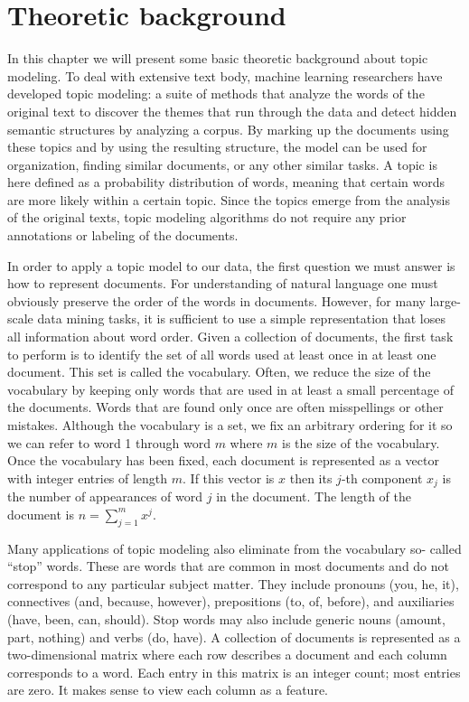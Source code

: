 \documentclass[12pt]{report}
\begin{document}
\section{Theoretic background}

In this chapter we will present some basic theoretic background about topic
modeling. To deal with extensive text body, machine learning researchers have
developed topic modeling: a suite of methods that analyze the words of the
original text to discover the themes that run through the data and detect
hidden semantic structures by analyzing a corpus. By marking up the documents
using these topics and by using the resulting structure, the model can be used
for organization, finding similar documents, or any other similar tasks. A
topic is here defined as a probability distribution of words, meaning that
certain words are more likely within a certain topic. Since the topics emerge
from the analysis of the original texts, topic modeling algorithms do not
require any prior annotations or labeling of the documents.\cite{Blei11introductionto}

In order to apply a topic model to our data, the first question we must answer
is how to represent documents. For understanding of natural language one must
obviously preserve the order of the words in documents. However, for many
large-scale data mining tasks, it is sufficient to use a simple representation
that loses all information about word order. Given a collection of documents,
the first task to perform is to identify the set of all words used at least
once in at least one document. This set is called the vocabulary. Often, we
reduce the size of the vocabulary by keeping only words that are used in at
least a small percentage of the documents. Words that are found only once are
often misspellings or other mistakes. Although the vocabulary is a set, we fix
an arbitrary ordering for it so we can refer to word 1 through word $m$ where
$m$ is the size of the vocabulary. Once the vocabulary has been fixed, each
document is represented as a vector with integer entries of length $m$. If this
vector is $x$ then its $j$-th component $x_j$ is the number of appearances of
word $j$ in the document. The length of the document is $n=\sum\limits_{j=1}^m
x^j$.

Many applications of topic modeling also eliminate from the vocabulary so-
called “stop” words. These are words that are common in most documents and do
not correspond to any particular subject matter. They include pronouns (you,
he, it), connectives (and, because, however), prepositions (to, of, before),
and auxiliaries (have, been, can, should). Stop words may also include generic
nouns (amount, part, nothing) and verbs (do, have). A collection of documents
is represented as a two-dimensional matrix where each row describes a document
and each column corresponds to a word. Each entry in this matrix is an integer
count; most entries are zero. It makes sense to view each column as a feature.
\end{document}
